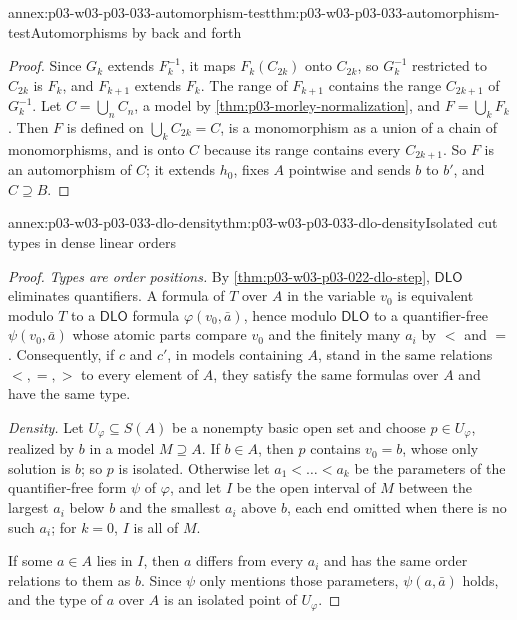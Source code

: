 \begin{annexitem}{annex:p03-w03-p03-033-automorphism-test}{thm:p03-w03-p03-033-automorphism-test}{Automorphisms by back and forth}
\begin{proof}
Since \(G_k\) extends \(F_k^{-1}\), it maps \(F_k(C_{2k})\) onto
\(C_{2k}\), so \(G_k^{-1}\) restricted to \(C_{2k}\) is \(F_k\), and
\(F_{k+1}\) extends \(F_k\). The range of \(F_{k+1}\) contains the range
\(C_{2k+1}\) of \(G_k^{-1}\). Let \(C=\bigcup_nC_n\), a model by
\cref{thm:p03-morley-normalization}, and \(F=\bigcup_kF_k\). Then \(F\) is
defined on \(\bigcup_kC_{2k}=C\), is a monomorphism as a union of a chain
of monomorphisms, and is onto \(C\) because its range contains every
\(C_{2k+1}\). So \(F\) is an automorphism of \(C\); it extends \(h_0\),
fixes \(A\) pointwise and sends \(b\) to \(b'\), and \(C\supseteq B\).
\end{proof}
\end{annexitem}

\begin{annexitem}{annex:p03-w03-p03-033-dlo-density}{thm:p03-w03-p03-033-dlo-density}{Isolated cut types in dense linear orders}
\begin{proof}
\emph{Types are order positions.} By \cref{thm:p03-w03-p03-022-dlo-step},
\(\mathsf{DLO}\) eliminates quantifiers. A formula of \(T\) over \(A\) in
the variable \(v_0\) is equivalent modulo \(T\) to a \(\mathsf{DLO}\)
formula \(\varphi(v_0,\bar a)\), hence modulo \(\mathsf{DLO}\) to a
quantifier-free \(\psi(v_0,\bar a)\) whose atomic parts compare \(v_0\)
and the finitely many \(a_i\) by \(<\) and \(=\). Consequently, if \(c\)
and \(c'\), in models containing \(A\), stand in the same relations
\(<,=,>\) to every element of \(A\), they satisfy the same formulas over
\(A\) and have the same type.

\emph{Density.} Let \(U_\varphi\subseteq S(A)\) be a nonempty basic
open set and choose \(p\in U_\varphi\), realized by \(b\) in a model
\(M\supseteq A\). If \(b\in A\), then \(p\) contains \(v_0=b\), whose only
solution is \(b\); so \(p\) is isolated. Otherwise let
\(a_1<\dots<a_k\) be the parameters of the quantifier-free form \(\psi\)
of \(\varphi\), and let \(I\) be the open interval of \(M\) between the
largest \(a_i\) below \(b\) and the smallest \(a_i\) above \(b\), each end
omitted when there is no such \(a_i\); for \(k=0\), \(I\) is all of \(M\).

If some \(a\in A\) lies in \(I\), then \(a\) differs from every \(a_i\)
and has the same order relations to them as \(b\). Since \(\psi\) only
mentions those parameters, \(\psi(a,\bar a)\) holds, and the type of \(a\)
over \(A\) is an isolated point of \(U_\varphi\).


\end{proof}
\end{annexitem}

